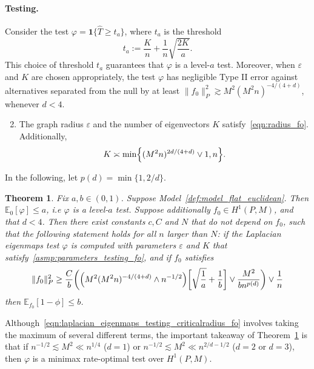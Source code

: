 \documentclass{article}
\newcommand{\1}{\mathbf{1}}
\newcommand{\Ebb}{\mathbb{E}}
\newcommand{\wh}[1]{\widehat{#1}}
\theoremstyle{alden}
\theoremstyle{aldenthm}
\newtheorem{theorem}{Theorem}
\theoremstyle{definition}
\theoremstyle{remark}
\begin{document}
\paragraph{Testing.} Consider the test $\varphi = \1\{\wh{T} \geq t_{a}\}$, where $t_{a}$ is the threshold
\begin{equation*}
t_{a} := \frac{K}{n} + \frac{1}{n}\sqrt{\frac{2K}{a}}.
\end{equation*}
This choice of threshold $t_{a}$ guarantees that $\varphi$ is a level-$a$ test. Moreover, when $\varepsilon$ and $K$ are chosen appropriately, the test $\varphi$ has negligible Type II error against alternatives separated from the null by at least $\|f_0\|_{P}^2 \gtrsim M^2(M^2n)^{-4/(4 + d)}$, whenever $d < 4$. 

\begin{enumerate}[label=(A\arabic*)]
	\setcounter{enumi}{1}
	\item 
	\label{asmp:parameters_testing_fo}
	The graph radius $\varepsilon$ and the number of eigenvectors $K$ satisfy~\eqref{eqn:radius_fo}. Additionally,
	\begin{equation}
	\label{eqn:eigenvector_testing_fo}
	K \asymp \min\Bigl\{(M^2n)^{2d/(4 + d)} \vee 1, n\Bigr\}.
	\end{equation}
\end{enumerate}
In the following, let $p(d) = \min\{1,2/d\}$.
\begin{theorem}
	\label{thm:laplacian_eigenmaps_testing_fo}
	Fix $a,b \in (0,1)$. Suppose Model~\ref{def:model_flat_euclidean}. Then $\mathbb{E}_0[\varphi] \leq a$, i.e $\varphi$ is a level-$a$ test. Suppose additionally $f_0 \in H^1(P,M)$, and that $d < 4$. Then there exist constants $c,C$ and $N$ that do not depend on $f_0$, such that the following statement holds for all $n$ larger than $N$: if the Laplacian eigenmaps test $\varphi$ is computed with parameters $\varepsilon$ and $K$ that satisfy~\ref{asmp:parameters_testing_fo}, and if $f_0$ satisfies
	\begin{equation}
	\label{eqn:laplacian_eigenmaps_testing_criticalradius_fo}
	\|f_0\|_P^2 \geq \frac{C}{b}\biggl(\Bigl(M^2(M^2n)^{-4/(4 + d) } \wedge n^{-1/2}\Bigr)\biggl[\sqrt{\frac{1}{a}} + \frac{1}{b}\biggr] \vee \frac{M^2}{b n^{p(d)}} \biggr) \vee \frac{1}{n}
	\end{equation}
	then $\Ebb_{f_0}[1 - \phi] \leq b$.
\end{theorem}
Although~\eqref{eqn:laplacian_eigenmaps_testing_criticalradius_fo} involves taking the maximum of several different terms, the important takeaway of Theorem~\ref{thm:laplacian_eigenmaps_testing_fo} is that if $n^{-1/2} \lesssim M^2 \ll n^{1/4}$ ($d = 1$) or $n^{-1/2} \lesssim M^2 \ll n^{2/d - 1/2}$ ($d = 2$ or $d = 3$), then $\varphi$ is a minimax rate-optimal test over $H^1(P,M)$.
\end{document}
